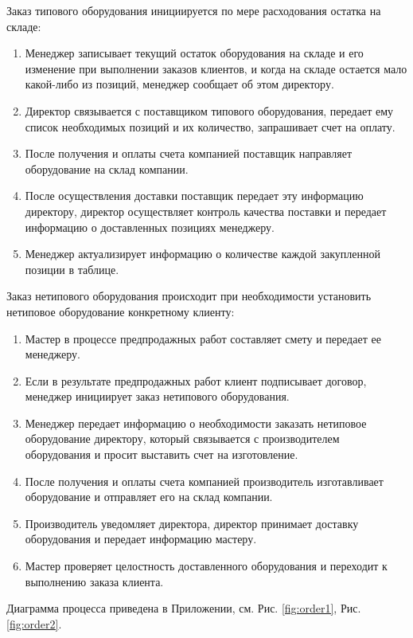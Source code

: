 \documentclass[a4paper,12pt]{article}
\begin{document}
Заказ типового оборудования инициируется по мере расходования остатка на складе:

\begin{enumerate}
    \item Менеджер записывает текущий остаток оборудования на складе и его изменение при выполнении заказов клиентов, и когда на складе остается мало какой-либо из позиций, менеджер сообщает об этом директору.
    \item Директор связывается с поставщиком типового оборудования, передает ему список необходимых позиций и их количество, запрашивает счет на оплату.
    \item После получения и оплаты счета компанией поставщик направляет оборудование на склад компании.
    \item После осуществления доставки поставщик передает эту информацию директору, директор осуществляет контроль качества поставки и передает информацию о доставленных позициях менеджеру.
    \item Менеджер актуализирует информацию о количестве каждой закупленной позиции в таблице.
\end{enumerate}

Заказ нетипового оборудования происходит при необходимости установить нетиповое оборудование конкретному клиенту:

\begin{enumerate}
    \item Мастер в процессе предпродажных работ составляет смету и передает ее менеджеру.
    \item Если в результате предпродажных работ клиент подписывает договор, менеджер инициирует заказ нетипового оборудования.
    \item Менеджер передает информацию о необходимости заказать нетиповое оборудование директору, который связывается с производителем оборудования и просит выставить счет на изготовление.
    \item После получения и оплаты счета компанией производитель изготавливает оборудование и отправляет его на склад компании.
    \item Производитель уведомляет директора, директор принимает доставку оборудования и передает информацию мастеру.
    \item Мастер проверяет целостность доставленного оборудования и переходит к выполнению заказа клиента.
\end{enumerate}

Диаграмма процесса приведена в Приложении, см. Рис. \ref{fig:order1}, Рис. \ref{fig:order2}.
\end{document}
